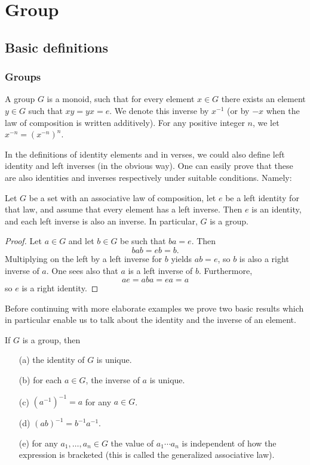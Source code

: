 \chapter{Group}
\section{Basic definitions}
\subsection{Groups}
A group $G$ is a monoid, such that for every element $x\in G$ there exists an element $y\in G$ such that $xy=yx=e$. We denote this inverse by $x^{-1}$ (or by $-x$ when the law of composition is written additively). For any positive integer $n$, we let $x^{-n}=(x^{-n})^n$.\par
In the definitions of identity elements and in verses, we could also define left identity and left inverses (in the obvious way). One can easily prove that these are also identities and inverses respectively under suitable conditions. Namely:
\begin{lemma}
Let $G$ be a set with an associative law of composition, let $e$ be a left identity for that law, and assume that every element has a left inverse. Then $e$ is an identity, and each left inverse is also an inverse. In particular, $G$ is a group.
\end{lemma}
\begin{proof}
Let $a\in G$ and let $b\in G$ be such that $ba=e$. Then
\[bab=eb=b.\]
Multiplying on the left by a left inverse for $b$ yields $ab=e$, so $b$ is also a right inverse of $a$. One sees also that $a$ is a left inverse of $b$. Furthermore,
\[ae=aba=ea=a\]
so $e$ is a right identity.
\end{proof}
Before continuing with more elaborate examples we prove two basic results which in particular enable us to talk about the identity and the inverse of an element.
\begin{proposition}
If $G$ is a group, then
\begin{itemize}
\item[(a)] the identity of $G$ is unique.
\item[(b)] for each $a\in G$, the inverse of $a$ is unique.
\item[(c)] $(a^{-1})^{-1}=a$ for any $a\in G$.
\item[(d)] $(ab)^{-1}=b^{-1}a^{-1}$.
\item[(e)] for any $a_1,\dots,a_n\in G$ the value of $a_1\cdots a_n$ is independent of how the expression is bracketed (this is called the generalized associative law).
\end{itemize}
\end{proposition}
